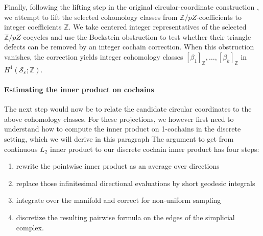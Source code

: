 \documentclass[a4paper,11pt, DIV=10]{scrartcl}
\numberwithin{equation}{section}
\theoremstyle{definition}
\theoremstyle{remark}
\newcommand{\Z}{\mathbb{Z}}
\newcommand{\mc}[1]{\mathcal{#1}}
\begin{document}
Finally, following the lifting step in the original circular-coordinate construction \cite[Section~2.4]{DeSilva2009persistent}, we attempt to lift the selected cohomology classes from $\Z/pZ$-coefficients to integer coefficients $\Z$.
We take centered integer representatives of the selected $\Z/pZ$-cocycles and use the Bockstein obstruction to test whether their triangle defects can be removed by an integer cochain correction.
When this obstruction vanishes, the correction yields integer cohomology classes $[\beta_1]_\Z,\dots, [\beta_k]_\Z$ in $H^1(\mc{S}_\varepsilon;\Z)$.
\paragraph{Estimating the inner product on cochains}
The next step would now be to relate the candidate circular coordinates to the above cohomology classes.
For these projections, we however first need to understand how to compute the inner product on 1-cochains in the discrete setting, which we will derive in this paragraph
The argument to get from continuous $L_2$ inner product to our discrete cochain inner product has four steps:
\begin{enumerate}
\item rewrite the pointwise inner product as an average over directions
\item replace those infinitesimal directional evaluations by short geodesic integrals
\item integrate over the manifold and correct for non-uniform sampling
\item discretize the resulting pairwise formula on the edges of the simplicial complex.
\end{enumerate}
\end{document}
